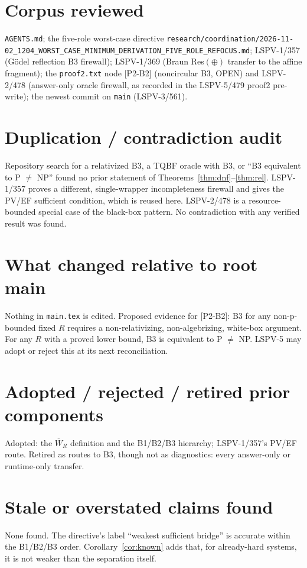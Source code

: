 \documentclass[11pt]{article}
\theoremstyle{definition}
\begin{document}
\section*{Corpus reviewed}
\texttt{AGENTS.md}; the five-role worst-case directive
\texttt{research/coordination/2026-11-02\_1204\_WORST\_CASE\_MINIMUM\_DERIVATION\_FIVE\_ROLE\_REFOCUS.md};
LSPV-1/357 (Gödel reflection B3 firewall); LSPV-1/369 (Braun Res$(\oplus)$ transfer to
the affine fragment); the \texttt{proof2.txt} node [P2-B2] (noncircular B3, OPEN) and
LSPV-2/478 (answer-only oracle firewall, as recorded in the LSPV-5/479 proof2
pre-write); the newest commit on \texttt{main} (LSPV-3/561).

\section*{Duplication / contradiction audit}
Repository search for a relativized B3, a TQBF oracle with B3, or ``B3 equivalent to
P $\ne$ NP'' found no prior statement of Theorems~\ref{thm:dnf}--\ref{thm:rel}.
LSPV-1/357 proves a different, single-wrapper incompleteness firewall and gives the
PV/EF sufficient condition, which is reused here. LSPV-2/478 is a resource-bounded
special case of the black-box pattern. No contradiction with any verified result was
found.

\section*{What changed relative to root main}
Nothing in \texttt{main.tex} is edited. Proposed evidence for [P2-B2]: B3 for any
non-p-bounded fixed $R$ requires a non-relativizing, non-algebrizing, white-box argument.
For any $R$ with a proved lower bound, B3 is equivalent to P $\ne$ NP. LSPV-5 may adopt
or reject this at its next reconciliation.

\section*{Adopted / rejected / retired prior components}
Adopted: the $\overline W_R$ definition and the B1/B2/B3 hierarchy; LSPV-1/357's PV/EF
route.
Retired as routes to B3, though not as diagnostics: every answer-only or runtime-only
transfer.

\section*{Stale or overstated claims found}
None found. The directive's label ``weakest sufficient bridge'' is accurate within the
B1/B2/B3 order. Corollary~\ref{cor:known} adds that, for already-hard systems, it is not
weaker than the separation itself.
\end{document}
